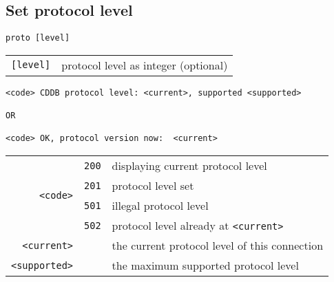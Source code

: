 \subsection{Set protocol level}
\begin{Verbatim}[frame=single,label=\textit{To Server},showspaces=true]
proto [level]
\end{Verbatim}
\begin{tabular}{rl}
\texttt{[level]} & protocol level as integer (optional)
\end{tabular}
\begin{Verbatim}[frame=single,label=\textit{From Server},showspaces=true]
<code> CDDB protocol level: <current>, supported <supported>

OR

<code> OK, protocol version now:  <current>
\end{Verbatim}
\begin{tabular}{rcl}
\multirow{4}{3em}{\texttt{<code>}}
& \texttt{200} & displaying current protocol level \\
& \texttt{201} & protocol level set \\
& \texttt{501} & illegal protocol level \\
& \texttt{502} & protocol level already at \texttt{<current>} \\
\texttt{<current>} & & the current protocol level of this connection \\
\texttt{<supported>} & & the maximum supported protocol level
\end{tabular}

\pagebreak

